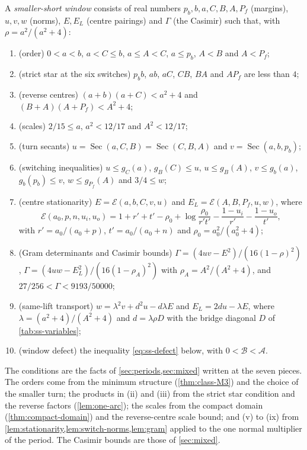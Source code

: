 \begin{definition}\label{def:ss-window}
A \emph{smaller-short window} consists of real numbers
$p_b,b,a,C,B,A,P_f$ (margins), $u,v,w$ (norms), $E,E_L$ (centre pairings) and $\Gamma$ (the
Casimir) such that, with $\rho=a^2/(a^2+4)$:
\begin{enumerate}[label=(\roman*)]
\item (order) $0<a<b$, $a<C\le b$, $a\le A<C$, $a\le p_b$, $A<B$ and $A<P_f$;
\item (strict star at the six switches) $p_bb$, $ab$, $aC$, $CB$, $BA$ and $AP_f$ are less
  than $4$;
\item (reverse centres) $(a+b)(a+C)<a^2+4$ and $(B+A)(A+P_f)<A^2+4$;
\item (scales) $2/15\le a$, $a^2<12/17$ and $A^2<12/17$;
\item (turn secants) $u=\operatorname{Sec}(a,C,B)=\operatorname{Sec}(C,B,A)$ and
  $v=\operatorname{Sec}(a,b,p_b)$;
\item (switching inequalities) $u\le g_C(a)$, $g_B(C)\le u$, $u\le g_B(A)$, $v\le g_b(a)$,
  $g_b(p_b)\le v$, $w\le g_{P_f}(A)$ and $3/4\le w$;
\item (centre stationarity) $E=\mathcal E(a,b,C,v,u)$ and $E_L=\mathcal E(A,B,P_f,u,w)$, where
  \[
    \mathcal E(a_0,p,n,u_i,u_o)=1+r'+t'-\rho_0+\log\frac{\rho_0}{r't'}-\frac{1-u_i}{r'}
    -\frac{1-u_o}{t'},
  \]
  with $r'=a_0/(a_0+p)$, $t'=a_0/(a_0+n)$ and $\rho_0=a_0^2/(a_0^2+4)$;
\item (Gram determinants and Casimir bounds)
  $\Gamma=(4uv-E^2)/(16(1-\rho)^2)$, $\Gamma=(4uw-E_L^2)/(16(1-\rho_A)^2)$ with
  $\rho_A=A^2/(A^2+4)$, and $27/256<\Gamma<9193/50000$;
\item (same-lift transport) $w=\lambda^2v+d^2u-d\lambda E$ and $E_L=2du-\lambda E$, where
  $\lambda=(a^2+4)/(A^2+4)$ and $d=\lambda\rho D$ with the bridge diagonal $D$ of
  \cref{tab:ss-variables};
\item (window defect) the inequality \eqref{eq:ss-defect} below, with $0<\mathcal B<\mathcal A$.
\end{enumerate}
\end{definition}

The conditions are the facts of \cref{sec:periods,sec:mixed} written at the seven pieces. The
orders come from the minimum structure (\cref{thm:class-M3}) and the choice of the smaller turn;
the products in (ii) and (iii) from the strict star condition and the reverse factors
(\cref{lem:one-arc}); the scales from the compact domain (\cref{thm:compact-domain}) and the
reverse-centre scale bound; and (v) to (ix) from
\cref{lem:stationarity,lem:switch-norms,lem:gram} applied to the one normal multiplier of the
period. The Casimir bounds are those of \cref{sec:mixed}.

